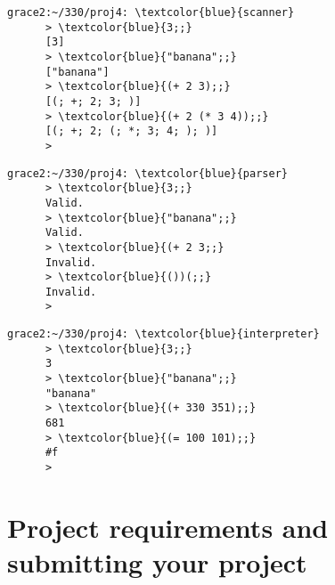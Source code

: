 \documentclass[11pt]{article}
\begin{document}
    {

      \addtolength{\columnsep}{-4.5mm}

      \begin{multicols}{3}

        \small

        \begin{Verbatim}[gobble=6,baselinestretch=.95,commandchars=\\\{\},
                         xleftmargin=4mm]
      grace2:~/330/proj4: \textcolor{blue}{scanner}
      > \textcolor{blue}{3;;}
      [3]
      > \textcolor{blue}{"banana";;}
      ["banana"]
      > \textcolor{blue}{(+ 2 3);;}
      [(; +; 2; 3; )]
      > \textcolor{blue}{(+ 2 (* 3 4));;}
      [(; +; 2; (; *; 3; 4; ); )]
      >
        \end{Verbatim}

        \begin{Verbatim}[gobble=6,baselinestretch=.95,commandchars=\\\{\},
                         xleftmargin=4mm]
      grace2:~/330/proj4: \textcolor{blue}{parser}
      > \textcolor{blue}{3;;}
      Valid.
      > \textcolor{blue}{"banana";;}
      Valid.
      > \textcolor{blue}{(+ 2 3;;}
      Invalid.
      > \textcolor{blue}{())(;;}
      Invalid.
      >
        \end{Verbatim}

        \begin{Verbatim}[gobble=6,baselinestretch=.95,commandchars=\\\{\}]
      grace2:~/330/proj4: \textcolor{blue}{interpreter}
      > \textcolor{blue}{3;;}
      3
      > \textcolor{blue}{"banana";;}
      "banana"
      > \textcolor{blue}{(+ 330 351);;}
      681
      > \textcolor{blue}{(= 100 101);;}
      #f
      >
        \end{Verbatim}

      \end{multicols}

    }

    \vspace{-4.5mm}

  \section{Project requirements and submitting your
           project\label{section:requirements}}
\end{document}
